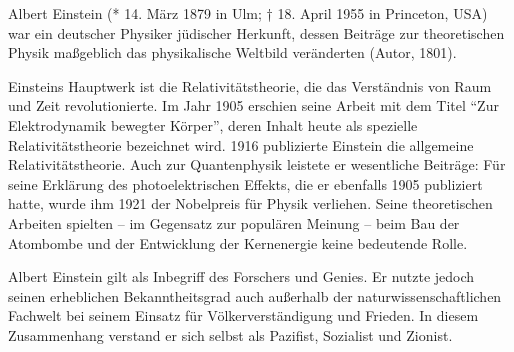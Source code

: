 Albert Einstein (* 14. März 1879 in Ulm; † 18. April 1955 in Princeton, USA) war
ein deutscher Physiker jüdischer Herkunft, dessen Beiträge zur theoretischen
Physik maßgeblich das physikalische Weltbild veränderten (Autor, 1801).

Einsteins Hauptwerk ist die Relativitätstheorie, die das Verständnis von Raum
und Zeit revolutionierte. Im Jahr 1905 erschien seine Arbeit mit dem Titel ``Zur
Elektrodynamik bewegter Körper'', deren Inhalt heute als spezielle
Relativitätstheorie bezeichnet wird. 1916 publizierte Einstein die allgemeine
Relativitätstheorie. Auch zur Quantenphysik leistete er wesentliche Beiträge:
Für seine Erklärung des photoelektrischen Effekts, die er ebenfalls 1905
publiziert hatte, wurde ihm 1921 der Nobelpreis für Physik verliehen. Seine
theoretischen Arbeiten spielten – im Gegensatz zur populären Meinung – beim Bau
der Atombombe und der Entwicklung der Kernenergie keine bedeutende Rolle.

Albert Einstein gilt als Inbegriff des Forschers und Genies. Er nutzte jedoch
seinen erheblichen Bekanntheitsgrad auch außerhalb der naturwissenschaftlichen
Fachwelt bei seinem Einsatz für Völkerverständigung und Frieden. In diesem
Zusammenhang verstand er sich selbst als Pazifist, Sozialist und Zionist.